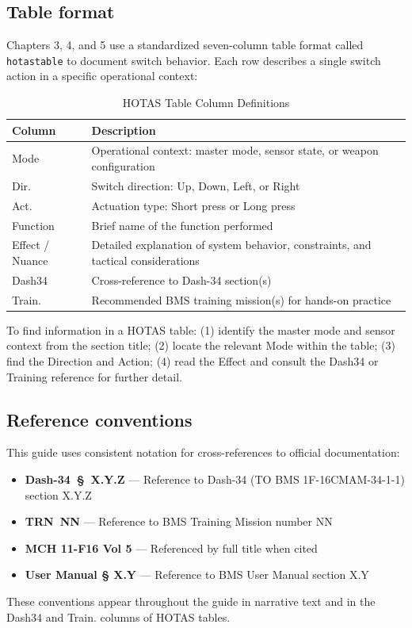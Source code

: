 \documentclass[11pt, a4paper, twoside]{report}
\providecommand{\dashref}[1]{Dash-34~\S~#1}
\providecommand{\trnref}[1]{TRN~#1}
\begin{document}
\subsection{Table format}
\label{sec:C1-S3-S2}

Chapters 3, 4, and 5 use a standardized seven-column table format called \texttt{hotastable} to document switch behavior. Each row describes a single switch action in a specific operational context:

\begin{table}[H]
\centering
\caption{HOTAS Table Column Definitions}
\label{tab:C1-hotastable-format}
\small
\renewcommand{\arraystretch}{1.25}
\begin{tabular}{L{2.2cm} L{11.5cm}}
\toprule
\textbf{Column} & \textbf{Description} \\
\midrule
Mode & Operational context: master mode, sensor state, or weapon configuration \\
Dir. & Switch direction: Up, Down, Left, or Right \\
Act. & Actuation type: Short press or Long press \\
Function & Brief name of the function performed \\
Effect / Nuance & Detailed explanation of system behavior, constraints, and tactical considerations \\
Dash34 & Cross-reference to Dash-34 section(s) \\
Train. & Recommended BMS training mission(s) for hands-on practice \\
\bottomrule
\end{tabular}
\end{table}

To find information in a HOTAS table: (1) identify the master mode and sensor context from the section title; (2) locate the relevant Mode within the table; (3) find the Direction and Action; (4) read the Effect and consult the Dash34 or Training reference for further detail.

\subsection{Reference conventions}
\label{sec:C1-S3-S3}

This guide uses consistent notation for cross-references to official documentation:
\begin{itemize}
  \item \textbf{\dashref{X.Y.Z}} --- Reference to Dash-34 (TO BMS 1F-16CMAM-34-1-1) section X.Y.Z
  \item \textbf{\trnref{NN}} --- Reference to BMS Training Mission number NN
  \item \textbf{MCH 11-F16 Vol 5} --- Referenced by full title when cited
  \item \textbf{User Manual § X.Y} --- Reference to BMS User Manual section X.Y
\end{itemize}
These conventions appear throughout the guide in narrative text and in the Dash34 and Train. columns of HOTAS tables.
\end{document}
